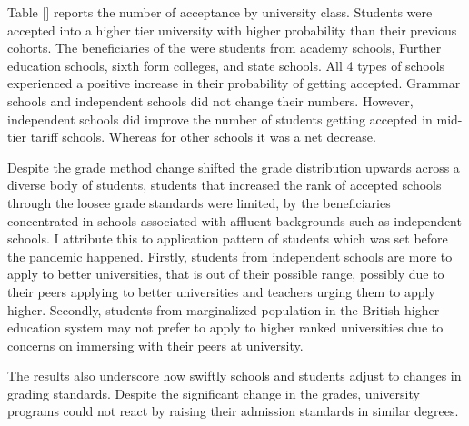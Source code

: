 Table [] reports the number of acceptance by university class. Students were accepted into a higher tier university with higher probability than their previous cohorts. The beneficiaries of the were students from academy schools, Further education schools, sixth form colleges, and state schools. All 4 types of schools experienced a positive increase in their probability of getting accepted. Grammar schools and independent schools did not change their numbers. However, independent schools did improve the number of students getting accepted in mid-tier tariff schools. Whereas for other schools it was a net decrease. 

Despite the grade method change shifted the grade distribution upwards across a diverse body of students, students that increased the rank of accepted schools through the loosee grade standards were limited, by the beneficiaries concentrated in schools associated with affluent backgrounds such as independent schools. I attribute this to application pattern of students which was set before the pandemic happened. Firstly, students from independent schools are more to apply to better universities, that is out of their possible range, possibly due to their peers applying to better universities and teachers urging them to apply higher. Secondly, students from marginalized population in the British higher education system may not prefer to apply to higher ranked universities due to concerns on immersing with their peers at university. 

The results also underscore how swiftly schools and students adjust to changes in grading standards. Despite the significant change in the grades, university programs could not react by raising their admission standards in similar degrees.